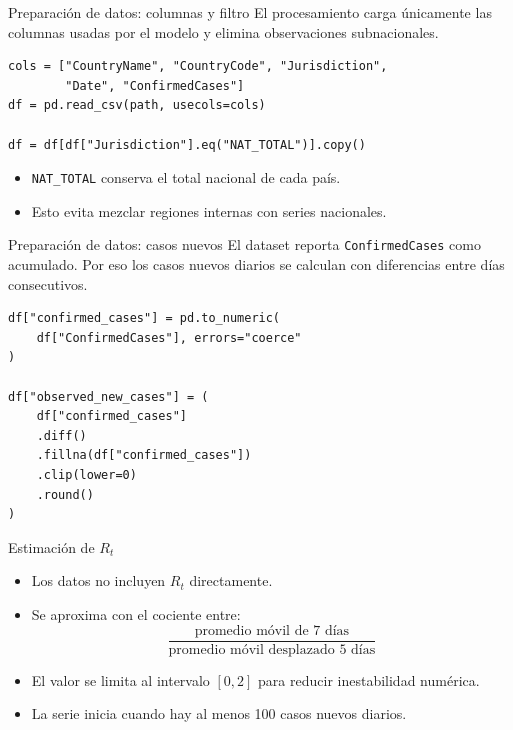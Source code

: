 \documentclass[aspectratio=169]{beamer}
\begin{document}
\begin{frame}[fragile]{Preparación de datos: columnas y filtro}
  \small
  El procesamiento carga únicamente las columnas usadas por el modelo y elimina
  observaciones subnacionales.

  \vspace{0.3cm}

  \scriptsize
  \begin{verbatim}
cols = ["CountryName", "CountryCode", "Jurisdiction",
        "Date", "ConfirmedCases"]
df = pd.read_csv(path, usecols=cols)

df = df[df["Jurisdiction"].eq("NAT_TOTAL")].copy()
  \end{verbatim}

  \normalsize
  \begin{itemize}
    \item \texttt{NAT\_TOTAL} conserva el total nacional de cada país.
    \item Esto evita mezclar regiones internas con series nacionales.
  \end{itemize}
\end{frame}

\begin{frame}[fragile]{Preparación de datos: casos nuevos}
  \small
  El dataset reporta \texttt{ConfirmedCases} como acumulado. Por eso los casos
  nuevos diarios se calculan con diferencias entre días consecutivos.

  \vspace{0.3cm}

  \scriptsize
  \begin{verbatim}
df["confirmed_cases"] = pd.to_numeric(
    df["ConfirmedCases"], errors="coerce"
)

df["observed_new_cases"] = (
    df["confirmed_cases"]
    .diff()
    .fillna(df["confirmed_cases"])
    .clip(lower=0)
    .round()
)
  \end{verbatim}
\end{frame}

\begin{frame}{Estimación de \(R_t\)}
  \begin{itemize}
    \item Los datos no incluyen \(R_t\) directamente.
    \item Se aproxima con el cociente entre:
      \[
        \frac{\text{promedio móvil de 7 días}}{\text{promedio móvil desplazado 5 días}}
      \]
    \item El valor se limita al intervalo \([0,2]\) para reducir inestabilidad
          numérica.
    \item La serie inicia cuando hay al menos 100 casos nuevos diarios.
  \end{itemize}
\end{frame}
\end{document}
